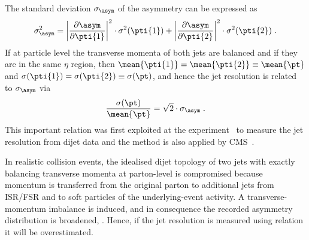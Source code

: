 The standard deviation $\sigma_{\asym}$ of the asymmetry can be expressed as 
\begin{equation*}
  \sigma^{2}_{\asym} = \left|\frac{\partial\asym}{\partial\pti{1}}\right|^{2}\cdot\sigma^{2}(\pti{1}) + \left|\frac{\partial\asym}{\partial\pti{2}}\right|^{2}\cdot\sigma^{2}(\pti{2}) \;.
\end{equation*}
If at particle level the transverse momenta of both jets are balanced and if they are in the same $\eta$ region, then \mbox{$\mean{\pti{1}} = \mean{\pti{2}} \equiv \mean{\pt}$} and \mbox{$\sigma(\pti{1}) = \sigma(\pti{2}) \equiv \sigma(\pt)$}, and hence the jet resolution is related to $\sigma_{\asym}$ via
\begin{equation}
  \label{eq:Jets:Resolution:Asymmetry:ResolutionVsAsymmetry}
  \frac{\sigma(\pt)}{\mean{\pt}} = \sqrt{2}\cdot\sigma_{\asym} \;.
\end{equation}
This important relation was first exploited at the \dzero experiment~\cite{PhysRevD.64.032003} to measure the jet resolution from dijet data and the method is also applied by CMS~\cite{1748-0221-6-11-P11002}.

In realistic collision events, the idealised dijet topology of two jets with exactly balancing transverse momenta at parton-level is compromised because momentum is transferred from the original parton to additional jets from ISR/FSR and to soft particles of the underlying-event activity.
A transverse-momentum imbalance is induced, and in consequence the recorded asymmetry distribution is broadened, \cf {}.
Hence, if the jet resolution is measured using relation  it will be overestimated.

